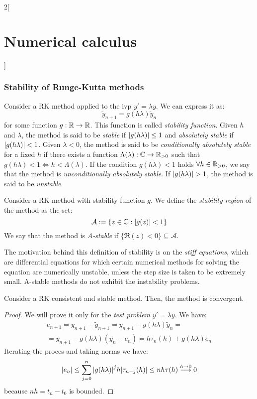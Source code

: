 \documentclass[../../../main_math.tex]{subfiles}
\begin{document}
\begin{multicols}{2}[\section{Numerical calculus}]
  \subsubsection{Stability of Runge-Kutta methods}
  \begin{definition}
    Consider a RK method applied to the ivp $y'=\lambda y$. We can express it as:
    $$
      \tilde{y}_{n+1}=g(h\lambda)\tilde{y}_n
    $$
    for some function $g:\mathbb{R}\rightarrow\mathbb{R}$. This function is called \emph{stability function}. Given $h$ and $\lambda$, the method is said to be \emph{stable} if $\abs{g(h\lambda)}\leq 1$ and \emph{absolutely stable} if $\abs{g(h\lambda)}< 1$. Given $\lambda<0$, the method is said to be \emph{conditionally absolutely stable} for a fixed $h$ if there exists a function $\Lambda(\lambda):\mathbb{C}\to\mathbb{R}_{>0}$ such that $g(h\lambda)<1\iff h<\Lambda(\lambda)$. If the condition $g(h \lambda)<1$ holds $\forall h\in\mathbb{R}_{>0}$, we say that the method is \emph{unconditionally absolutely stable}. If $\abs{g(h\lambda)}> 1$, the method is said to be \emph{unstable}.
  \end{definition}
  \begin{definition}
    Consider a RK method with stability function $g$. We define the \emph{stability region} of the method as the set:
    $$
      \mathcal{A}:=\{z\in\mathbb{C}:\abs{g(z)}< 1\}
    $$
    We say that the method is \emph{A-stable} if $\{\Re(z)<0\}\subseteq \mathcal{A}$.
  \end{definition}
  \begin{remark}
    The motivation behind this definition of stability is on the \emph{stiff equations}, which are differential equations for which certain numerical methods for solving the equation are numerically unstable, unless the step size is taken to be extremely small. A-stable methods do not exhibit the instability problems.
  \end{remark}
  \begin{theorem}
    Consider a RK consistent and stable method. Then, the method is convergent.
  \end{theorem}
  \begin{proof}
    We will prove it only for the \emph{test problem} $y'=\lambda y$. We have:
    \begin{multline*}
      e_{n+1}={y}_{n+1}-{\tilde{y}}_{n+1}={y}_{n+1}-g(h\lambda){\tilde{y}}_n=\\
      ={y}_{n+1}-g(h\lambda)({y}_n-e_n)=h{\tau}_n(h)+g(h\lambda)e_n
    \end{multline*}
    Iterating the proces and taking norms we have:
    $$
      \abs{{e}_n}\leq\sum_{j=0}^n{\abs{g(h\lambda)}}^jh\abs{{\tau}_{n-j}(h)}\leq nh\tau(h)\overset{h\to 0}{\longrightarrow}0
    $$
    because $nh=t_n-t_0$ is bounded.
  \end{proof}

\end{multicols}
\end{document}
